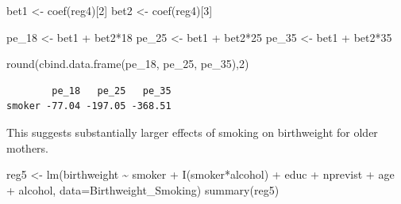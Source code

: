 \documentclass[
  letterpaper,
  DIV=11,
  numbers=noendperiod]{scrreprt}
\newenvironment{Shaded}{\begin{snugshade}}{\end{snugshade}}
\newcommand{\AttributeTok}[1]{\textcolor[rgb]{0.40,0.45,0.13}{#1}}
\newcommand{\DecValTok}[1]{\textcolor[rgb]{0.68,0.00,0.00}{#1}}
\newcommand{\FunctionTok}[1]{\textcolor[rgb]{0.28,0.35,0.67}{#1}}
\newcommand{\NormalTok}[1]{\textcolor[rgb]{0.00,0.23,0.31}{#1}}
\newcommand{\OtherTok}[1]{\textcolor[rgb]{0.00,0.23,0.31}{#1}}
\newcommand{\SpecialCharTok}[1]{\textcolor[rgb]{0.37,0.37,0.37}{#1}}
\begin{document}
\begin{Shaded}
\begin{Highlighting}[]
\NormalTok{bet1 }\OtherTok{\textless{}{-}} \FunctionTok{coef}\NormalTok{(reg4)[}\DecValTok{2}\NormalTok{]}
\NormalTok{bet2 }\OtherTok{\textless{}{-}} \FunctionTok{coef}\NormalTok{(reg4)[}\DecValTok{3}\NormalTok{]}

\NormalTok{pe\_18 }\OtherTok{\textless{}{-}}\NormalTok{ bet1 }\SpecialCharTok{+}\NormalTok{ bet2}\SpecialCharTok{*}\DecValTok{18}
\NormalTok{pe\_25 }\OtherTok{\textless{}{-}}\NormalTok{ bet1 }\SpecialCharTok{+}\NormalTok{ bet2}\SpecialCharTok{*}\DecValTok{25}
\NormalTok{pe\_35 }\OtherTok{\textless{}{-}}\NormalTok{ bet1 }\SpecialCharTok{+}\NormalTok{ bet2}\SpecialCharTok{*}\DecValTok{35}

\FunctionTok{round}\NormalTok{(}\FunctionTok{cbind.data.frame}\NormalTok{(pe\_18, pe\_25, pe\_35),}\DecValTok{2}\NormalTok{)}
\end{Highlighting}
\end{Shaded}

\begin{verbatim}
        pe_18   pe_25   pe_35
smoker -77.04 -197.05 -368.51
\end{verbatim}

This suggests substantially larger effects of smoking on birthweight for
older mothers.

\begin{Shaded}
\begin{Highlighting}[]
\NormalTok{reg5 }\OtherTok{\textless{}{-}} \FunctionTok{lm}\NormalTok{(birthweight }\SpecialCharTok{\textasciitilde{}}\NormalTok{ smoker }\SpecialCharTok{+} \FunctionTok{I}\NormalTok{(smoker}\SpecialCharTok{*}\NormalTok{alcohol) }\SpecialCharTok{+}\NormalTok{ educ }\SpecialCharTok{+}\NormalTok{ nprevist }\SpecialCharTok{+}\NormalTok{ age }\SpecialCharTok{+}\NormalTok{ alcohol,}
           \AttributeTok{data=}\NormalTok{Birthweight\_Smoking)}
\FunctionTok{summary}\NormalTok{(reg5)}
\end{Highlighting}
\end{Shaded}
\end{document}
